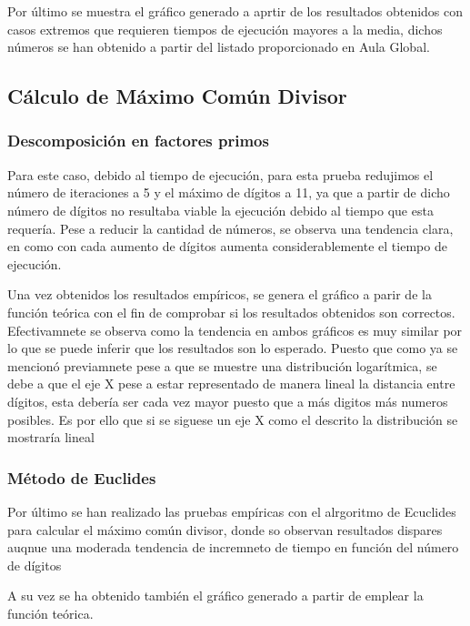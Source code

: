 Por último se muestra el gráfico generado a aprtir de los resultados obtenidos con casos extremos que requieren tiempos de ejecución mayores a la media, dichos números se han obtenido a partir del listado proporcionado en Aula Global.
\begin{figure}[H]
\end{figure}




\subsection{Cálculo de Máximo Común Divisor}

\subsubsection{Descomposición en factores primos}
Para este caso, debido al tiempo de ejecución, para esta prueba redujimos el número de iteraciones a 5 y el máximo de dígitos a 11, ya que  a partir de dicho número de dígitos no resultaba viable la ejecución debido al tiempo que esta requería. Pese a reducir la cantidad de números, se observa una tendencia clara, en como con cada aumento de dígitos aumenta considerablemente el tiempo de ejecución.
\begin{figure}[H]
\end{figure}

Una vez obtenidos los resultados empíricos, se genera el gráfico a parir de la función teórica con el fin de comprobar si los resultados obtenidos son correctos. Efectivamnete se observa como la tendencia en ambos gráficos es muy similar por lo que se puede inferir que los resultados son lo esperado. Puesto que como ya se mencionó previamnete pese a que se muestre una distribución logarítmica, se debe a que el eje X pese a estar representado de manera lineal la distancia entre dígitos, esta debería ser cada vez mayor puesto que a más digitos más numeros posibles. Es por ello que si se siguese un eje X como el descrito la distribución se mostraría lineal
\begin{figure}[H]
\end{figure}



\subsubsection{Método de Euclides}
Por último se han realizado las pruebas empíricas con el alrgoritmo de Ecuclides para calcular el máximo común divisor, donde so observan resultados dispares auqnue una moderada tendencia de incremneto de tiempo en función del número de dígitos
\begin{figure}[H]
\end{figure}

A su vez se ha obtenido también el gráfico generado a partir de emplear la función teórica.
\begin{figure}[H]
\end{figure}
